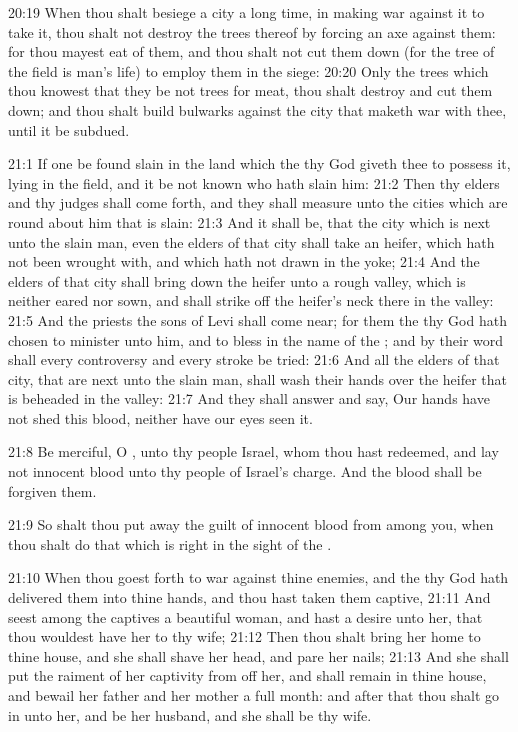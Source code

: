 20:19 When thou shalt besiege a city a long time, in making war
against it to take it, thou shalt not destroy the trees thereof by
forcing an axe against them: for thou mayest eat of them, and thou
shalt not cut them down (for the tree of the field is man's life) to
employ them in the siege: 20:20 Only the trees which thou knowest that
they be not trees for meat, thou shalt destroy and cut them down; and
thou shalt build bulwarks against the city that maketh war with thee,
until it be subdued.

21:1 If one be found slain in the land which the \LORD thy God giveth
thee to possess it, lying in the field, and it be not known who hath
slain him: 21:2 Then thy elders and thy judges shall come forth, and
they shall measure unto the cities which are round about him that is
slain: 21:3 And it shall be, that the city which is next unto the
slain man, even the elders of that city shall take an heifer, which
hath not been wrought with, and which hath not drawn in the yoke; 21:4
And the elders of that city shall bring down the heifer unto a rough
valley, which is neither eared nor sown, and shall strike off the
heifer's neck there in the valley: 21:5 And the priests the sons of
Levi shall come near; for them the \LORD thy God hath chosen to
minister unto him, and to bless in the name of the \LORD; and by their
word shall every controversy and every stroke be tried: 21:6 And all
the elders of that city, that are next unto the slain man, shall wash
their hands over the heifer that is beheaded in the valley: 21:7 And
they shall answer and say, Our hands have not shed this blood, neither
have our eyes seen it.

21:8 Be merciful, O \LORD, unto thy people Israel, whom thou hast
redeemed, and lay not innocent blood unto thy people of Israel's
charge. And the blood shall be forgiven them.

21:9 So shalt thou put away the guilt of innocent blood from among
you, when thou shalt do that which is right in the sight of the \LORD.

21:10 When thou goest forth to war against thine enemies, and the \LORD
thy God hath delivered them into thine hands, and thou hast taken them
captive, 21:11 And seest among the captives a beautiful woman, and
hast a desire unto her, that thou wouldest have her to thy wife; 21:12
Then thou shalt bring her home to thine house, and she shall shave her
head, and pare her nails; 21:13 And she shall put the raiment of her
captivity from off her, and shall remain in thine house, and bewail
her father and her mother a full month: and after that thou shalt go
in unto her, and be her husband, and she shall be thy wife.

